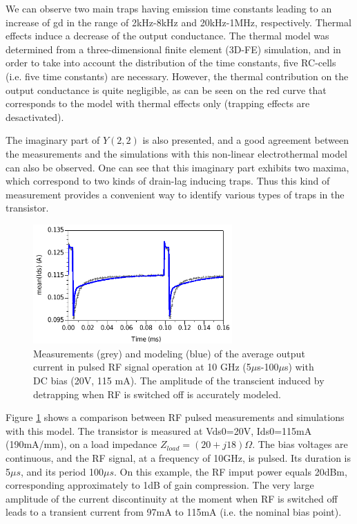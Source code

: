 \documentclass[conference]{IEEEtran}
\begin{document}
We can observe two main traps having emission time constants leading to an increase of gd in the range of 2kHz-8kHz and 20kHz-1MHz, respectively. Thermal effects induce a decrease of the output conductance. The thermal model was determined from a three-dimensional finite element (3D-FE) simulation, and in order to take into account the distribution of the time constants, five RC-cells (i.e. five time constants) are necessary. However, the thermal contribution on the output conductance is quite negligible, as can be seen on the red curve that corresponds to the model with thermal effects only (trapping effects are desactivated).

The imaginary part of $Y(2,2)$ is also presented, and a good agreement between the measurements and the simulations with this non-linear electrothermal model can also be observed. One can see that this imaginary part exhibits two maxima, which correspond to two kinds of drain-lag inducing traps. Thus this kind of measurement provides a convenient way to identify various types of traps in the transistor. 

\begin{figure}[ht!] %
\centering
\includegraphics[width=3.0in]{Compare_pulse.pdf}
\caption{Measurements (grey) and modeling (blue) of the average output current in pulsed RF signal operation at 10 GHz (5$\mu$s-100$\mu$s) with DC bias (20V, 115 mA). The amplitude of the transcient induced by detrapping when RF is switched off is accurately modeled.}
\label{Compare_pulse}
\end{figure}

Figure \ref{Compare_pulse} shows a comparison between RF pulsed measurements and simulations with this model. The transistor is measured at Vds0=20V, Ids0=115mA (190mA/mm), on a load impedance $Z_{load}=\left(20+j18\right)\Omega$. The bias voltages are continuous, and the RF signal, at a frequency of 10GHz, is pulsed. Its duration is 5$\mu s$, and its period 100$\mu s$. On this example, the RF imput power equals 20dBm, corresponding approximately to 1dB of gain compression. The very large amplitude of the current discontinuity at the moment when RF is switched off leads to a transient current from 97mA to 115mA (i.e. the nominal bias point). 
\end{document}
